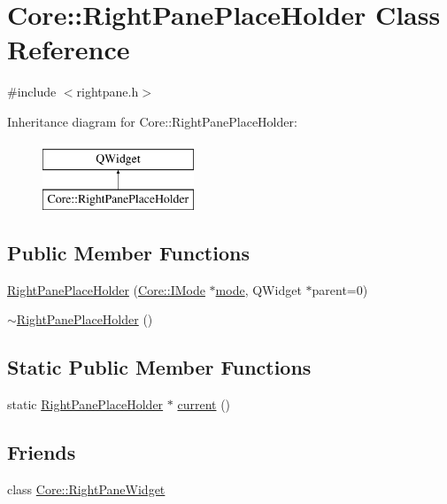 \hypertarget{class_core_1_1_right_pane_place_holder}{\section{Core\-:\-:Right\-Pane\-Place\-Holder Class Reference}
\label{class_core_1_1_right_pane_place_holder}
}


{\ttfamily \#include $<$rightpane.\-h$>$}

Inheritance diagram for Core\-:\-:Right\-Pane\-Place\-Holder\-:\begin{figure}[H]
\begin{center}
\leavevmode
\includegraphics[height=2.000000cm]{class_core_1_1_right_pane_place_holder}
\end{center}
\end{figure}
\subsection*{Public Member Functions}
\begin{DoxyCompactItemize}
\item 
\hyperlink{group___core_plugin_gaa98e96e4dc0e41e99b50b305ff9fad3f}{Right\-Pane\-Place\-Holder} (\hyperlink{class_core_1_1_i_mode}{Core\-::\-I\-Mode} $\ast$\hyperlink{glext_8h_a1e71d9c196e4683cc06c4b54d53f7ef5}{mode}, Q\-Widget $\ast$parent=0)
\item 
\hyperlink{group___core_plugin_gaf01c936611ccfda71b72c4cf3018edfd}{$\sim$\-Right\-Pane\-Place\-Holder} ()
\end{DoxyCompactItemize}
\subsection*{Static Public Member Functions}
\begin{DoxyCompactItemize}
\item 
static \hyperlink{class_core_1_1_right_pane_place_holder}{Right\-Pane\-Place\-Holder} $\ast$ \hyperlink{group___core_plugin_ga78b79d10a15088de40b5fea71c4add4c}{current} ()
\end{DoxyCompactItemize}
\subsection*{Friends}
\begin{DoxyCompactItemize}
\item 
class \hyperlink{group___core_plugin_gacfc5dac0611e5189b4f2dcbeface99d1}{Core\-::\-Right\-Pane\-Widget}
\end{DoxyCompactItemize}


